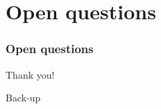 \documentclass[aspectratio=169,11pt,usenames,dvipsnames]{beamer}
\renewcommand{\thefootnote}{\color{customblue}\faPaperPlaneO}
\newcommand\blfootnote[1]{%
  \begingroup
  \renewcommand\thefootnote{}\footnote{#1}%
  \addtocounter{footnote}{-1}%
  \endgroup
}
\begin{document}




\section{Open questions}



\begin{frame}
    \frametitle{Open questions}
\end{frame}


\begin{frame}{}
    \vspace{20pt}
    \huge\centering Thank you!
\end{frame}

\begin{frame}{}
    \huge\centering Back-up
\end{frame}
\end{document}
